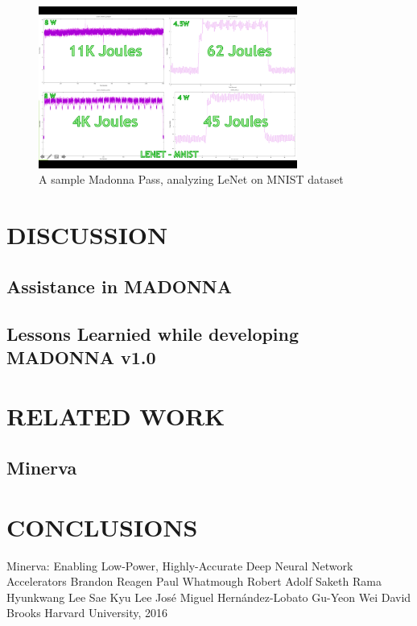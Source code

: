 \documentclass[letterpaper, 10 pt, conference]{ieeeconf}
\begin{document}
          \begin{figure}[h]
              \centering
              \includegraphics[width=85mm,scale=1]{lenet.png}
              \caption{A sample Madonna Pass, analyzing LeNet on MNIST dataset}
              \label{lenet}
          \end{figure}


\section{DISCUSSION}

\subsection{Assistance in MADONNA}
\subsection{Lessons Learnied while developing MADONNA v1.0}

\section{RELATED WORK}

\subsection{Minerva}

\section{CONCLUSIONS}

\begin{thebibliography}{99}

 Minerva: Enabling Low-Power, Highly-Accurate
Deep Neural Network Accelerators
Brandon Reagen Paul Whatmough Robert Adolf Saketh Rama
Hyunkwang Lee Sae Kyu Lee José Miguel Hernández-Lobato
Gu-Yeon Wei David Brooks
Harvard University, 2016 

\end{thebibliography}
\end{document}
